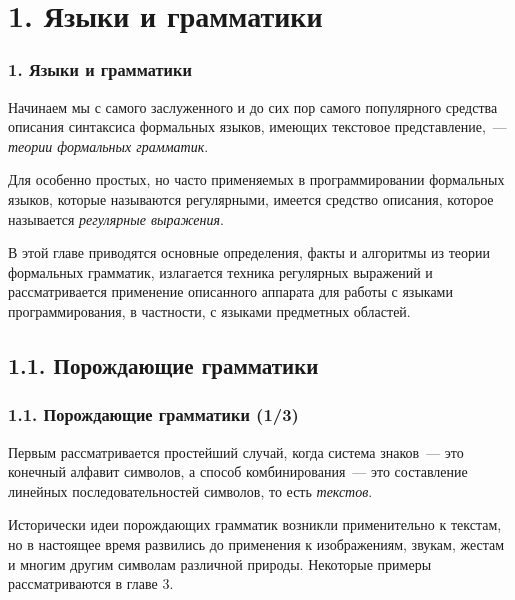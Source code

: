 \documentclass[mathserif,12pt,aspectratio=169]{beamer}
\def\emразделенной{\em разделенной}
\renewcommand{\index}[1]{}
\def\em#1{\it\color{blue}#1}
\def\odmkey#1#2{{\it\color{red} #1}\index{#2}}
\begin{document}
\section{1. Языки и грамматики}\label{1.}
\begin{frame}
\frametitle{1. Языки и грамматики }

Начинаем мы с самого заслуженного и 
до сих пор самого популярного средства описания синтаксиса формальных языков, имеющих текстовое представление,~---
 \odmkey{теории формальных
грамматик}{Теория!формальных!грамматик}.


\medskip
Для особенно простых, но часто применяемых в программировании
формальных языков, которые называются регулярными,
имеется средство описания, которое называется
\odmkey{регулярные выражения}{Выражение!регулярное}.

\medskip
В этой главе приводятся основные определения, факты и алгоритмы из
теории формальных грамматик, излагается техника регулярных выражений
и рассматривается применение описанного аппарата для работы
с языками программирования, в частности,
с языками предметных областей.

\end{frame}


\subsection{1.1. Порождающие грамматики}
\label{1.1.}
\begin{frame}
\frametitle{1.1. Порождающие грамматики (1/3)}
Первым рассматривается простейший случай, когда система знаков~--- это
конечный алфавит символов, а способ
комбинирования~--- это составление линейных последовательностей
символов, то есть {\em текстов}.

\bigskip
\begin{digress}
Исторически идеи порождающих грамматик возникли 
применительно к текстам, но в настоящее время
развились до применения к изображениям, звукам, жестам и многим 
другим символам различной природы. 
Некоторые примеры рассматриваются в главе 3.  
\end{digress}
\end{frame}
\end{document}
